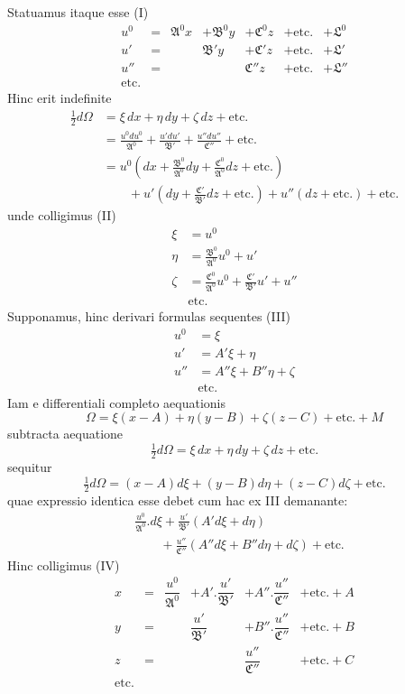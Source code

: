 Statuamus itaque esse (I)
\[
\begin{array}{rclllll}
u^0&=&\mathfrak{A}^0x&+\mathfrak{B}^0y&+\mathfrak{C}^0z&+\text{etc.}&+\mathfrak{L}^0\\
u'&=&&\mathfrak{B}'y&+\mathfrak{C}'z&+\text{etc.}&+\mathfrak{L}'\\
u''&=&&&\mathfrak{C}''z&+\text{etc.}&+\mathfrak{L}''\\
\text{etc.}
\end{array}
\]
Hinc erit indefinite
\[
\begin{aligned}
\tfrac12d\Omega&=\xi\,dx+\eta\,dy+\zeta\,dz+\text{etc.}\\[3pt]
&=\frac{u^0du^0}{\mathfrak{A}^0}+\frac{u'du'}{\mathfrak{B}'}+\frac{u''du''}{\mathfrak{C}''}+\text{etc.}\\[3pt]
&=u^0\left(dx+\frac{\mathfrak{B}^0}{\mathfrak{A}^0}dy+\frac{\mathfrak{C}^0}{\mathfrak{A}^0}dz+\text{etc.}\right)\\
&\qquad+u'\left(dy+\frac{\mathfrak{C}'}{\mathfrak{B}'}dz+\text{etc.}\right)+u''(dz+\text{etc.})+\text{etc.}
\end{aligned}
\]
unde colligimus (II)
\[
\begin{aligned}
\xi&=u^0\\
\eta&=\frac{\mathfrak{B}^0}{\mathfrak{A}^0}u^0+u'\\
\zeta&=\frac{\mathfrak{C}^0}{\mathfrak{A}^0}u^0+\frac{\mathfrak{C}'}{\mathfrak{B}'}u'+u''\\
&\text{etc.}
\end{aligned}
\]
Supponamus, hinc derivari formulas sequentes (III)
\[
\begin{aligned}
u^0&=\xi\\
u'&=A'\xi+\eta\\
u''&=A''\xi+B''\eta+\zeta\\
&\text{etc.}
\end{aligned}
\]
Iam e differentiali completo aequationis
\[
\Omega=\xi(x-A)+\eta(y-B)+\zeta(z-C)+\text{etc.}+M
\]
subtracta aequatione
\[
\tfrac12d\Omega=\xi\,dx+\eta\,dy+\zeta\,dz+\text{etc.}
\]
sequitur
\[
\tfrac12d\Omega=(x-A)d\xi+(y-B)d\eta+(z-C)d\zeta+\text{etc.}
\]
quae expressio identica esse debet cum hac ex III demanante:
\[
\begin{aligned}
&\frac{u^0}{\mathfrak{A}^0}.d\xi+\frac{u'}{\mathfrak{B}'}(A'd\xi+d\eta)\\
&\qquad+\frac{u''}{\mathfrak{C}''}(A''d\xi+B''d\eta+d\zeta)+\text{etc.}
\end{aligned}
\]
Hinc colligimus (IV)
\[
\begin{array}{rcllll}
x&=&\dfrac{u^0}{\mathfrak{A}^0}&+A'.\dfrac{u'}{\mathfrak{B}'}&+A''.\dfrac{u''}{\mathfrak{C}''}&+\text{etc.}+A\\[7pt]
y&=&&\dfrac{u'}{\mathfrak{B}'}&+B''.\dfrac{u''}{\mathfrak{C}''}&+\text{etc.}+B\\[7pt]
z&=&&&\dfrac{u''}{\mathfrak{C}''}&+\text{etc.}+C\\[4pt]
\text{etc.}
\end{array}
\]
